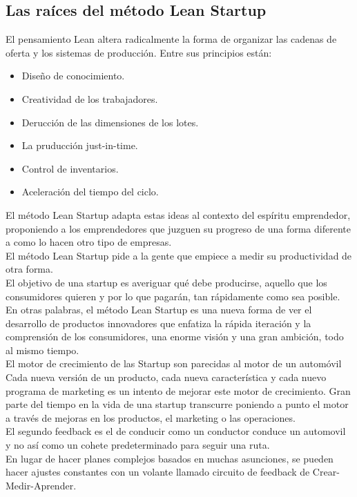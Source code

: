 \documentclass[10pt]{article}
\begin{document}
\begin{multicols}{2}
\subsection*{Las raíces del método Lean Startup}
El pensamiento Lean altera radicalmente la forma de organizar las cadenas de oferta y los sistemas de producción. Entre sus principios están:
\begin{itemize}
\item Diseño de conocimiento.
\item Creatividad de los trabajadores.
\item Derucción de las dimensiones de los lotes.
\item La pruducción just-in-time.
\item Control de inventarios.
\item Aceleración del tiempo del ciclo.
\end{itemize}
El método Lean Startup adapta estas ideas al contexto del espíritu emprendedor, proponiendo a los emprendedores que juzguen su progreso de una forma diferente a como lo hacen otro tipo de empresas.\\
El método Lean Startup pide a la gente que empiece a medir su productividad de otra forma.\\
{\color{blue}El objetivo de una startup es averiguar qué debe producirse, aquello que los consumidores quieren y por lo que pagarán, tan rápidamente como sea posible. En otras palabras, el método Lean Startup es una nueva forma de ver el desarrollo de productos innovadores que enfatiza la rápida iteración y la comprensión de los consumidores, una enorme visión y una gran ambición, todo al mismo tiempo.}\\
El motor de crecimiento de las Startup son parecidas al motor de un automóvil\\
Cada nueva versión de un producto, cada nueva característica y cada nuevo programa de marketing es un intento de mejorar este motor de crecimiento. Gran parte del tiempo en la vida de una startup transcurre poniendo a punto el motor a través de mejoras en los productos, el marketing o las operaciones.\\
El segundo feedback es el de conducir como un conductor conduce un automovil y no así como un cohete predeterminado para seguir una ruta.\\
{\color{blue}En lugar de hacer planes complejos basados en muchas asunciones, se pueden hacer ajustes constantes con un volante llamado circuito de feedback de Crear-Medir-Aprender.}\\

\end{multicols}
\end{document}
